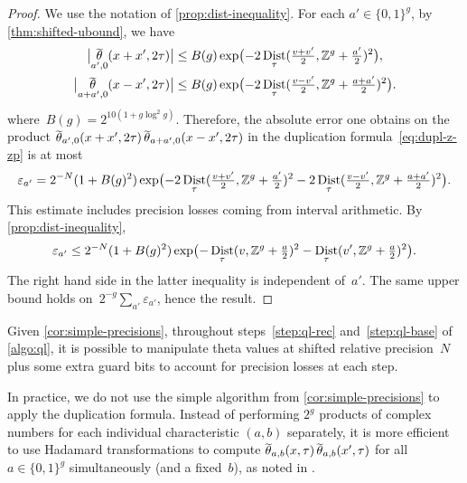 \documentclass[12pt,oneside]{amsart}
\numberwithin{equation}{section}
\theoremstyle{definition}
\newcommand{\Z}{\mathbb{Z}}
\newcommand{\eps}{\varepsilon}
\DeclareMathOperator{\Dist}{Dist}
\DeclareMathOperator{\thetatilde}{\rlap{\raisebox{-0.1ex}{$\widetilde{\phantom{\,t}}$}}\theta}
\DeclarePairedDelimiter{\abs}{|}{|}
\DeclarePairedDelimiter{\paren}{(}{)}
\begin{document}
\begin{proof}
  We use the notation of \cref{prop:dist-inequality}.  For each
  $a'\in \{0,1\}^g$, by \cref{thm:shifted-ubound}, we have
  \begin{align*}
    \abs[\big]{\thetatilde_{a',0}(x+x',2\tau)} &\leq B(g)  \exp\paren[\big]{-2\Dist_\tau(\tfrac{v+v'}{2},\Z^g + \tfrac{a'}2)^2},\\
    \abs[\big]{\thetatilde_{a+a',0}(x-x',2\tau)} &\leq B(g) \exp\paren[\big]{-2\Dist_\tau(\tfrac{v-v'}{2},\Z^g + \tfrac{a+a'}2)^2}.
  \end{align*}
  where~$B(g) = 2^{10(1+g\log^2 g)}$.  Therefore, the absolute error one
  obtains on the product
  $\thetatilde_{a',0}(x+x',2\tau) \thetatilde_{a+a',0}(x-x',2\tau)$ in the
  duplication formula~\eqref{eq:dupl-z-zp} is at most
  \begin{displaymath}
    \eps_{a'} = 2^{-N}(1 + B(g)^2) \exp\paren[\big]{-2\Dist_{\tau}(\tfrac{v+v'}{2},\Z^g + \tfrac{a'}2)^2
      - 2 \Dist_{\tau}(\tfrac{v-v'}{2}, \Z^g + \tfrac{a+a'}{2})^2}.
  \end{displaymath}
  This estimate includes precision losses coming from interval arithmetic. By
  \cref{prop:dist-inequality},
  \begin{displaymath}
    \eps_{a'} \leq 2^{-N} (1 + B(g)^2) \exp\paren[\big]{-\Dist_\tau(v, \Z^g +
      \tfrac{a}{2})^2 - \Dist_\tau(v', \Z^g + \tfrac{a}{2})^2}.
  \end{displaymath}
  The right hand side in the latter inequality is independent of~$a'$. The same
  upper bound holds on~$2^{-g}\sum_{a'} \eps_{a'}$, hence the result.
\end{proof}

Given \cref{cor:simple-precisions}, throughout steps~\eqref{step:ql-rec}
and~\eqref{step:ql-base} of \cref{algo:ql}, it is possible to manipulate theta
values at shifted relative precision~$N$ plus some extra guard bits to account
for precision losses at each step.

In practice, we do not use the simple algorithm from
\cref{cor:simple-precisions} to apply the duplication formula. Instead of
performing $2^g$ products of complex numbers for each individual characteristic
$(a,b)$ separately, it is more efficient to use Hadamard transformations to
compute $\thetatilde_{a,b}(x,\tau)\thetatilde_{a,b}(x',\tau)$ for all
$a\in \{0,1\}^g$ simultaneously (and a fixed~$b$), as noted in
\cite[§4.3]{labrandeComputingThetaFunctions2016}. 
\end{document}
